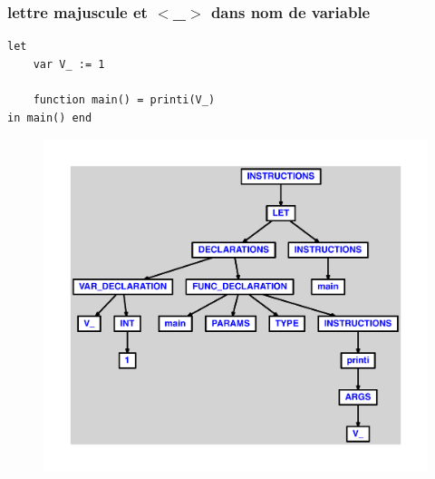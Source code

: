 \documentclass{article}
\begin{document}
\subsubsection{lettre majuscule et $ < $\_$ > $ dans nom de variable}
\begin{lstlisting}
let
	var V_ := 1

	function main() = printi(V_)
in main() end
\end{lstlisting}
\newpage
\begin{figure}[H]
\centering
\includegraphics[max width=\textwidth]{ast/ast_320.pdf}
\end{figure}
\newpage
\end{document}
